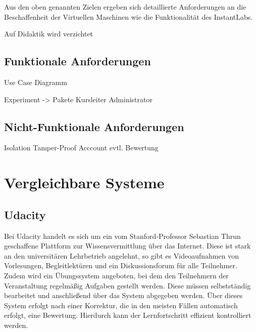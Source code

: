 		Aus den oben genannten Zielen ergeben sich detaillierte Anforderungen an die Beschaffenheit der Virtuellen Maschinen wie die Funktionalität des InstantLabs.

		Auf Didaktik wird verzichtet
				
		\subsection{Funktionale Anforderungen}

		Use Case Diagramm

		Experiment -> Pakete
		Kursleiter
		Administrator
				
		\subsection{Nicht-Funktionale Anforderungen}

		Isolation
		Tamper-Proof
		Acccount
		evtl. Bewertung

	

\section{Vergleichbare Systeme}
\label{sec:solutions}
		
		\subsection{Udacity}

			Bei Udacity handelt es sich um ein vom Stanford-Professor Sebastian Thrun geschaffene Plattform zur Wissensvermittlung über das Internet.
			Diese ist stark an den universitären Lehrbetrieb angelehnt, so gibt es Videoaufnahmen von Vorlesungen, Begleitlektüren und ein Diskussionsforum für alle Teilnehmer. 
			Zudem wird ein Übungssystem angeboten, bei dem den Teilnehmern der Veranstaltung regelmäßig Aufgaben gestellt werden. Diese müssen selbstständig bearbeitet und anschließend über das System abgegeben werden.
			Über dieses System erfolgt nach einer Korrektur, die in den meisten Fällen automatisch erfolgt, eine Bewertung.
			Hierdurch kann der Lernfortschritt effizient kontrolliert werden. %

